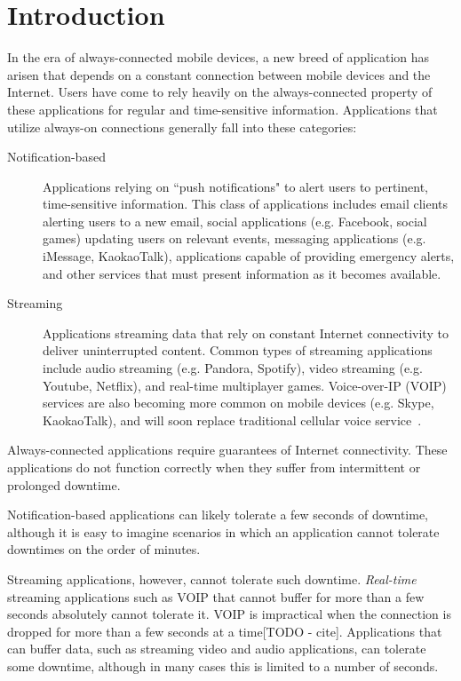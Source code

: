 \section{Introduction}
\label{sec:intro}

In the era of always-connected mobile devices, a new breed of application has arisen that depends on a constant connection between mobile devices and the Internet. Users have come to rely heavily on the always-connected property of these applications for regular and time-sensitive information. Applications that utilize always-on connections generally fall into these categories:

\begin{description}
\item[Notification-based] Applications relying on ``push notifications" to alert users to pertinent, time-sensitive information. This class of applications includes email clients alerting users to a new email, social applications (e.g. Facebook, social games) updating users on relevant events, messaging applications (e.g. iMessage, KaokaoTalk), applications capable of providing emergency alerts, and other services that must present information as it becomes available.
\item[Streaming] Applications streaming data that rely on constant Internet connectivity to deliver uninterrupted content. Common types of streaming applications include audio streaming (e.g. Pandora, Spotify), video streaming (e.g. Youtube, Netflix), and real-time multiplayer games. Voice-over-IP (VOIP) services are also becoming more common on mobile devices (e.g. Skype, KaokaoTalk), and will soon replace traditional cellular voice service~\cite{cellPlans}.
\end{description}

Always-connected applications require guarantees of Internet connectivity. These applications do not function correctly when they suffer from intermittent or prolonged downtime.

Notification-based applications can likely tolerate a few seconds of downtime, although it is easy to imagine scenarios in which an application cannot tolerate downtimes on the order of minutes.

Streaming applications, however, cannot tolerate such downtime. \emph{Real-time} streaming applications such as VOIP that cannot buffer for more than a few seconds absolutely cannot tolerate it. VOIP is impractical when the connection is dropped for more than a few seconds at a time[TODO - cite]. Applications that can buffer data, such as streaming video and audio applications, can tolerate some downtime, although in many cases this is limited to a number of seconds.

